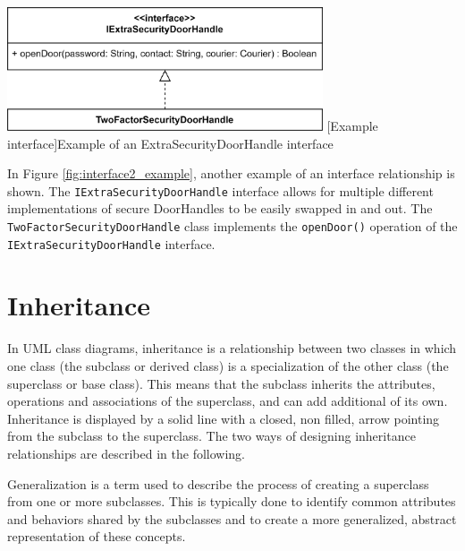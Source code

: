 \documentclass[
	12pt,
    a4paper,
    egregdoesnotlikesansseriftitles, %
    toc=chapterentrywithdots,
    oneside, openany,
    titlepage,
    parskip=half,
    headings=normal,  %
    listof=totoc,
    bibliography=totocnumbered,
    index=totoc,
    captions=tableheading,  %
    listof=flat,
    numbers=noenddot, %
    final]
    {scrbook}
\begin{document}
\vspace{1em}
\begin{minipage}{\linewidth}
	\centering
	\includegraphics[width=0.7\textwidth]{figures/interface/doorhandle_sec_interface.jpg}
	[Example interface]{Example of an ExtraSecurityDoorHandle interface}
	\label{fig:interface2_example}
\end{minipage}

In Figure \ref{fig:interface2_example}, another example of an interface relationship is shown. 
The \texttt{IExtraSecurityDoorHandle} interface allows for multiple different implementations of secure DoorHandles to be easily swapped in and out. The \texttt{TwoFactorSecurityDoorHandle} class implements the \texttt{openDoor()} operation of the \texttt{IExtraSecurityDoorHandle} interface.


\chapter{Inheritance}
In UML class diagrams, inheritance is a relationship between two classes in which one class (the subclass or derived class) is a specialization of the other class (the superclass or base class). 
This means that the subclass inherits the attributes, operations and associations of the superclass, and can add additional of its own.
Inheritance is displayed by a solid line with a closed, non filled, arrow pointing from the subclass to the superclass. \cite{ibm_generalization}
The two ways of designing inheritance relationships are described in the following.

Generalization is a term used to describe the process of creating a superclass from one or more subclasses. 
This is typically done to identify common attributes and behaviors shared by the subclasses and to create a more generalized, abstract representation of these concepts. \cite[p. 69-70] {seidl2015uml} \cite{ibm_generalization} 
\end{document}
